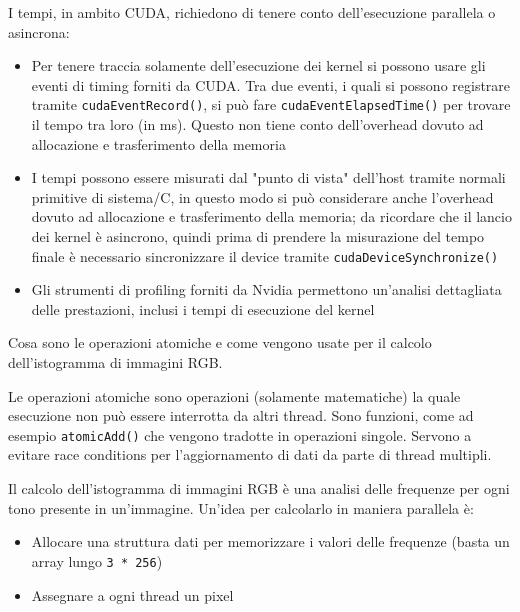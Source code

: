 \begin{questions}
\begin{solution}
    	 I tempi, in ambito CUDA, richiedono di tenere conto dell'esecuzione parallela o asincrona: 
    	 \begin{itemize}
    	 	\item Per tenere traccia solamente dell'esecuzione dei kernel si possono usare gli eventi di timing forniti da CUDA. Tra due eventi, i quali si possono registrare tramite \texttt{cudaEventRecord()}, si può fare \texttt{cudaEventElapsedTime()} per trovare il tempo tra loro (in ms). Questo non tiene conto dell'overhead dovuto ad allocazione e trasferimento della memoria
    	 	
    	 	\item I tempi possono essere misurati dal "punto di vista" dell'host tramite normali primitive di sistema/C, in questo modo si può considerare anche l'overhead dovuto ad allocazione e trasferimento della memoria; da ricordare che il lancio dei kernel è asincrono, quindi prima di prendere la misurazione del tempo finale è necessario sincronizzare il device tramite \texttt{cudaDeviceSynchronize()}
    	 	
    	 	\item Gli strumenti di profiling forniti da Nvidia permettono un'analisi dettagliata delle prestazioni, inclusi i tempi di esecuzione del kernel
    	 \end{itemize}
    \end{solution}
    
    \question Cosa sono le operazioni atomiche e come vengono usate per il calcolo dell'istogramma di immagini RGB.
    
    \begin{solution}
    	Le operazioni atomiche sono operazioni (solamente matematiche) la quale esecuzione non può essere interrotta da altri thread. Sono funzioni, come ad esempio \texttt{atomicAdd()} che vengono tradotte in operazioni singole. Servono a evitare race conditions per l'aggiornamento di dati da parte di thread multipli.
    	
    	Il calcolo dell'istogramma di immagini RGB è una analisi delle frequenze per ogni tono presente in un'immagine. Un'idea per calcolarlo in maniera parallela è:
    	\begin{itemize}
    		\item Allocare una struttura dati per memorizzare i valori delle frequenze (basta un array lungo \texttt{3 * 256})
    		
    		\item Assegnare a ogni thread un pixel
    		

\end{itemize}
\end{solution}
\end{questions}
